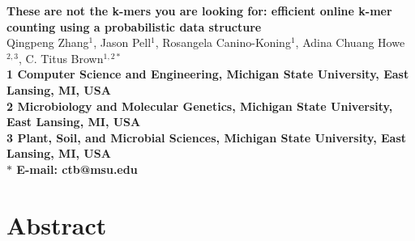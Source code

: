 \documentclass[10pt]{article}
\date{}
\begin{document}
\begin{flushleft}
{\Large
\textbf{These are not the k-mers you are looking for: efficient
online k-mer counting using a probabilistic data structure}
}
\\
Qingpeng Zhang$^{1}$, 
Jason Pell$^{1}$,
Rosangela Canino-Koning$^{1}$,
Adina Chuang Howe$^{2,3}$,
C. Titus Brown$^{1,2\ast}$
\\
\bf{1} Computer Science and Engineering, Michigan State University,
East Lansing, MI, USA
\\
\bf{2} Microbiology and Molecular Genetics, Michigan State University,
East Lansing, MI, USA
\\
\bf{3} Plant, Soil, and Microbial Sciences, Michigan State University, 
East Lansing, MI, USA
\\
$\ast$ E-mail: ctb@msu.edu
\end{flushleft}







\section*{Abstract}
\end{document}
